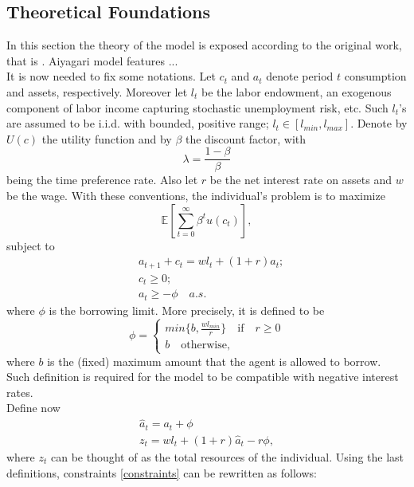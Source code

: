 \documentclass[12pt]{article}
\begin{document}
\subsection{Theoretical Foundations}
In this section the theory of the model is exposed according to the original work, that is \cite{aiya94}.
Aiyagari model features ... \\
It is now needed to fix some notations. Let $c_t$ and $a_t$ denote period $t$ consumption and assets, respectively. Moreover let $l_t$ be the labor endowment, an exogenous component of labor income capturing stochastic unemployment risk, etc. Such $l_t$'s are assumed to be i.i.d. with bounded, positive range; $l_t \in \left[l_{min}, l_{max} \right]$. Denote by $U(c)$ the utility function and  by $\beta$ the discount factor, with
\begin{equation}
\lambda = \frac{1 - \beta}{\beta}
\end{equation}
being the time preference rate. Also let $r$ be the net interest rate on assets and $w$ be the wage. With these conventions, the individual's problem is to maximize
\begin{equation}
\mathbb E \left[ \sum_{t=0}^{\infty} \beta^t u(c_t) \right],
\end{equation}
subject to 
\begin{align}
\label{constraints}
&a_{t+1} + c_t = wl_t + (1+r)a_t; \nonumber \\
&c_t \geq 0; \nonumber \\
&a_t \geq -\phi \quad a.s .
\end{align}
where $\phi$ is the borrowing limit. More precisely, it is defined to be
\begin{equation}
\phi = \begin{cases}
		min\{b, \frac{wl_{min}}{r} \} \quad \text{if} \quad r \geq 0 \\
		b \quad \text{otherwise,}
		\end{cases}
\end{equation}
where $b$ is the (fixed) maximum amount that the agent is allowed to borrow. Such definition is required for the model to be compatible with negative interest rates. \\
Define now
\begin{align}
\label{hata}
\hat{a}_t = a_t + \phi \\
z_t = wl_t + (1 + r)\hat{a}_t -r\phi,
\end{align}
where $z_t$ can be thought of as the total resources of the individual. Using the last definitions, constraints \ref{constraints} can be rewritten as follows:
\end{document}
